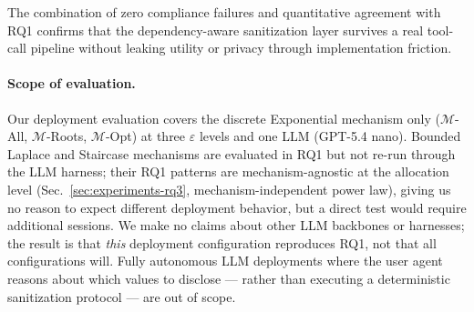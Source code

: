 \noindent The combination of zero compliance failures and quantitative agreement with RQ1 confirms that the dependency-aware sanitization layer survives a real tool-call pipeline without leaking utility or privacy through implementation friction.


\paragraph{Scope of evaluation.}
Our deployment evaluation covers the discrete Exponential mechanism only ($\mathcal{M}$-All, $\mathcal{M}$-Roots, $\mathcal{M}$-Opt) at three $\varepsilon$ levels and one LLM (GPT-5.4 nano). Bounded Laplace and Staircase mechanisms are evaluated in RQ1 but not re-run through the LLM harness; their RQ1 patterns are mechanism-agnostic at the allocation level (Sec.~\ref{sec:experiments-rq3}, mechanism-independent power law), giving us no reason to expect different deployment behavior, but a direct test would require additional sessions. We make no claims about other LLM backbones or harnesses; the result is that \emph{this} deployment configuration reproduces RQ1, not that all configurations will. Fully autonomous LLM deployments where the user agent reasons about which values to disclose --- rather than executing a deterministic sanitization protocol --- are out of scope.